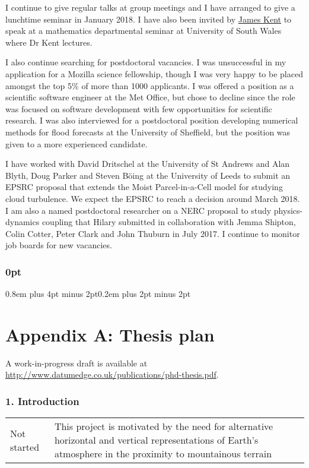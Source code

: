 \documentclass[a4paper,11pt]{article}
\begin{document}
I continue to give regular talks at group meetings and I have arranged to give a lunchtime seminar in January 2018.
I have also been invited by \href{http://staff.southwales.ac.uk/users/8005-jkent}{James Kent} to speak at a mathematics departmental seminar at University of South Wales where Dr Kent lectures.

I also continue searching for postdoctoral vacancies.
I was unsuccessful in my application for a Mozilla science fellowship, though I was very happy to be placed amongst the top 5\% of more than 1000 applicants.
I was offered a position as a scientific software engineer at the Met Office, but chose to decline since the role was focused on software development with few opportunities for scientific research.
I was also interviewed for a postdoctoral position developing numerical methods for flood forecasts at the University of Sheffield, but the position was given to a more experienced candidate.

I have worked with David Dritschel at the University of St Andrews and Alan Blyth, Doug Parker and Steven B\"{o}ing at the University of Leeds to submit an EPSRC proposal that extends the Moist Parcel-in-a-Cell model \citep{boeing2017} for studying cloud turbulence.  We expect the EPSRC to reach a decision around March 2018.
I am also a named postdoctoral researcher on a NERC proposal to study physics-dynamics coupling that Hilary submitted in collaboration with Jemma Shipton, Colin Cotter, Peter Clark and John Thuburn in July 2017.
I continue to monitor job boards for new vacancies.

                                                 


\newpage

\titlespacing\subsubsection{0pt}{0.8em plus 4pt minus 2pt}{0.2em plus 2pt minus 2pt}

\section*{Appendix A: Thesis plan}
\footnotesize
A work-in-progress draft is available at \url{http://www.datumedge.co.uk/publications/phd-thesis.pdf}.

\subsubsection*{1. Introduction}
\begin{tabularx}{\linewidth}{>{\hsize=0.9in}X X}
Not started & This project is motivated by the need for alternative horizontal and vertical representations of Earth's atmosphere in the proximity to mountainous terrain
\end{tabularx}
\end{document}
